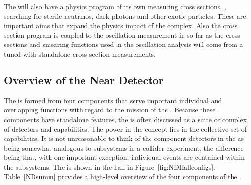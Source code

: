 The   will also have a physics program of its own measuring cross sections, , searching for sterile neutrinos, dark photons and other exotic particles. These are important aims that expand the physics impact of the  complex.  Also the cross section program is coupled to the oscillation measurement in so far as the cross sections and smearing functions used in the oscillation analysis will come from a  tuned with standalone cross section measurements.

\subsection{Overview of the Near Detector}
\label{sec:BriefOverview}

The   is formed from four components that serve important individual and overlapping functions with regard to the mission of the .  Because these components have standalone features, the   is often discussed as a suite or complex of detectors and capabilities.  The power in the   concept lies in the collective set of capabilities.  It is not unreasonable to think of the component detectors in the   as being somewhat analogous to subsystems in a collider experiment, the difference being that, with one important exception, individual events are contained within the subsystems.  
The   is shown in the   hall in Figure~\ref{fig:NDHallconfigs}.  Table~\ref{NDsumm} provides a high-level overview of the four components of the  .  

